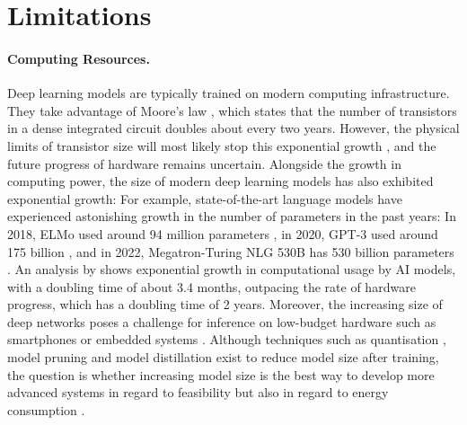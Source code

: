 \section{Limitations}
\paragraph{Computing Resources.} Deep learning models are typically trained on modern computing infrastructure. They take advantage of Moore's law , which states that the number of transistors in a dense integrated circuit doubles about every two years. However, the physical limits of transistor size will most likely stop this exponential growth , and the future progress of hardware remains uncertain.
Alongside the growth in computing power, the size of modern deep learning models has also exhibited exponential growth:
For example, state-of-the-art language models have experienced astonishing growth in the number of parameters in the past years: In 2018, ELMo used around 94 million parameters , in 2020, GPT-3 used around 175 billion , and in 2022, Megatron-Turing NLG 530B has 530 billion parameters .
An analysis by  shows exponential growth in computational usage by AI models, with a doubling time of about 3.4 months, outpacing the rate of hardware progress, which has a doubling time of 2 years. Moreover, the increasing size of deep networks poses a challenge for inference on low-budget hardware such as smartphones or embedded systems . Although techniques such as quantisation , model pruning  and model distillation  exist to reduce model size after training, the question is whether increasing model size is the best way to develop more advanced systems in regard to feasibility but also in regard to energy consumption \cite{garcia-martin_estimation_2019}.

